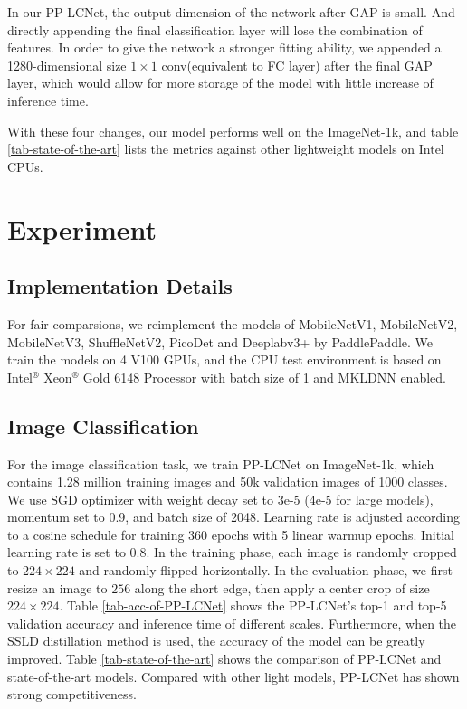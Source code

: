 \documentclass[final]{cvpr}
\begin{document}
In our PP-LCNet, the output dimension of the network after GAP is small. And directly appending the final classification layer will lose the combination of features. In order to give the network a stronger fitting ability, we appended a 1280-dimensional size $1 \times 1$ conv(equivalent to FC layer) after the final GAP layer, which would allow for more storage of the model with little increase of inference time.


With these four changes, our model performs well on the ImageNet-1k\cite{imagenet}, and table \ref{tab-state-of-the-art} lists the metrics against other lightweight models on Intel CPUs.


\section{Experiment}

\subsection{Implementation Details}
For fair comparsions, we reimplement the models of MobileNetV1\cite{mobilenetv1}, MobileNetV2\cite{mobilenetv2}, MobileNetV3\cite{mbv3}, ShuffleNetV2\cite{shufflenetv2}, PicoDet\cite{ppdet2019} and Deeplabv3+\cite{deeplabv3+} by PaddlePaddle. We train the models on 4 V100 GPUs, and the CPU test environment is based on Intel$^\circledR$ Xeon$^\circledR$ Gold 6148 Processor with batch size of 1 and MKLDNN enabled.

\subsection{Image Classification}

For the image classification task, we train PP-LCNet on ImageNet-1k\cite{imagenet}, which contains 1.28 million training images and 50k validation images of 1000 classes. We use SGD optimizer with weight decay set to 3e-5 (4e-5 for large models), momentum set to 0.9, and batch size of 2048. Learning rate is adjusted according to a cosine schedule for training 360 epochs with 5 linear warmup epochs. Initial learning rate is set to 0.8.  In the training phase, each image is randomly cropped to $224\times224$ and randomly flipped horizontally. In the evaluation phase, we first resize an image to $256$ along the short edge, then apply a center crop of size $224 \times 224$. Table \ref{tab-acc-of-PP-LCNet} shows the PP-LCNet's top-1 and top-5 validation accuracy and inference time of different scales. Furthermore, when the SSLD\cite{cui2021beyond} distillation method is used, the accuracy of the model can be greatly improved. Table \ref{tab-state-of-the-art} shows the comparison of PP-LCNet and state-of-the-art models. Compared with other light models, PP-LCNet has shown strong competitiveness.
\end{document}
